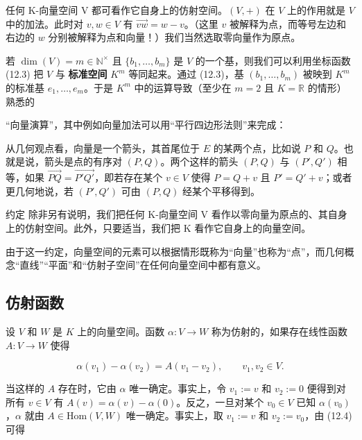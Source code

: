 \begin{example}

任何 K-向量空间 V 都可看作它自身上的仿射空间。$(V,+)$ 在 $V$ 上的作用就是 $V$ 中的加法。此时对 $v, w \in V$ 有 $\overrightarrow{vw} = w - v$。（这里 $v$ 被解释为点，而等号左边和右边的 $w$ 分别被解释为点和向量！）我们当然选取零向量作为原点。

若  $ \dim(V) = m \in \mathbb{N}^\times $ 且  $ \{b_1, \ldots, b_m\} $ 是  $ V $ 的一个基，则我们可以利用坐标函数 (12.3) 把  $ V $ 与 \textbf{标准空间}  $ K^m $ 等同起来。通过 (12.3)，基  $ (b_1, \ldots, b_m) $ 被映到  $ K^m $ 的标准基  $ e_1, \ldots, e_m $。于是  $ K^m $ 中的运算导致（至少在  $ m = 2 $ 且  $ K = \mathbb{R} $ 的情形）熟悉的

“向量演算”，其中例如向量加法可以用“平行四边形法则”来完成：


从几何观点看，向量是一个箭头，其首尾位于 $E$ 的某两个点，比如说 $P$ 和 $Q$。也就是说，箭头是点的有序对 $(P,Q)$。两个这样的箭头 $(P,Q)$ 与 $(P',Q')$ 相等，如果 $\overrightarrow{PQ} = \overrightarrow{P'Q'}$，即若存在某个 $v \in V$ 使得 $P = Q + v$ 且 $P' = Q' + v$；或者更几何地说，若 $(P', Q')$ 可由 $(P,Q)$ 经某个平移得到。

约定 除非另有说明，我们把任何 K-向量空间 V 看作以零向量为原点的、其自身上的仿射空间。此外，只要适当，我们把 K 看作它自身上的向量空间。

由于这一约定，向量空间的元素可以根据情形既称为“向量”也称为“点”，而几何概念“直线”“平面”和“仿射子空间”在任何向量空间中都有意义。

\end{example}

\subsection*{仿射函数}

设 $V$ 和 $W$ 是 $K$ 上的向量空间。函数 $\alpha: V \to W$ 称为仿射的，如果存在线性函数 $A: V \to W$ 使得

\begin{equation}
\alpha(v_{1})-\alpha(v_{2})=A(v_{1}-v_{2}),\qquad v_{1},v_{2}\in V.
\end{equation}

当这样的 $A$ 存在时，它由 $\alpha$ 唯一确定。事实上，令 $v_1 := v$ 和 $v_2 := 0$ 便得到对所有 $v \in V$ 有 $A(v) = \alpha(v) - \alpha(0)$。反之，一旦对某个 $v_0 \in V$ 已知 $\alpha(v_0)$，$\alpha$ 就由 $A \in \mathrm{Hom}(V, W)$ 唯一确定。事实上，取 $v_1 := v$ 和 $v_2 := v_0$，由 (12.4) 可得

